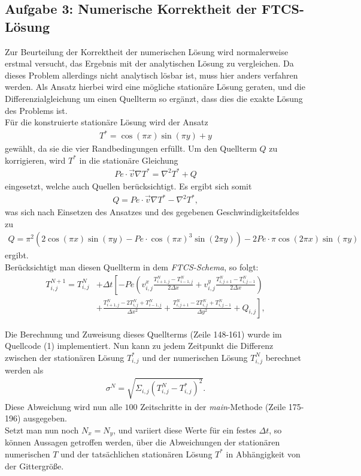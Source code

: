 \documentclass[12pt,a4paper,titlepage,headinclude,bibtotoc]{scrartcl}
\begin{document}
\subsection{Aufgabe 3: Numerische Korrektheit der FTCS-Lösung}
\label{sec:task3}
Zur Beurteilung der Korrektheit der numerischen Lösung wird normalerweise erstmal versucht, das Ergebnis mit der analytischen Lösung zu vergleichen. Da dieses Problem allerdings nicht analytisch lösbar ist, muss hier anders verfahren werden. Als Ansatz hierbei wird eine mögliche stationäre Lösung geraten, und die Differenzialgleichung um einen Quellterm so ergänzt, dass dies die exakte Lösung des Problems ist.\\
Für die konstruierte stationäre Lösung wird der Ansatz
\begin{align*}
T^* = \cos(\pi x) \sin(\pi y) + y
\end{align*} 
gewählt, da sie die vier Randbedingungen erfüllt.
Um den Quellterm $Q$ zu korrigieren, wird $T^*$ in die stationäre Gleichung
\begin{align*}
Pe \cdot \vec{v} \nabla T^* = \nabla^2 T^* + Q 
\end{align*}
eingesetzt, welche auch Quellen berücksichtigt. Es ergibt sich somit
\begin{align*}
Q = Pe \cdot \vec{v} \nabla T^* - \nabla^2 T^*,
\end{align*}
was sich nach Einsetzen des Ansatzes und des gegebenen Geschwindigkeitsfeldes zu
\begin{align*}
Q = \pi^2 \left(2 \cos(\pi x) \sin(\pi y) - Pe \cdot \cos(\pi x)^3 \sin(2 \pi y) \right) - 2 Pe \cdot \pi \cos(2 \pi x) \sin(\pi y)
\end{align*}
ergibt.\\
Berücksichtigt man diesen Quellterm in dem \textit{FTCS-Schema}, so folgt:
\begin{align}
\label{eq:ftcs_source}
T_{i,j}^{N+1} = T_{i,j}^N & + \Delta t \left[ -Pe \left( v^x_{i,j} \frac{T_{i+1,j}^N-T_{i-1,j}^N}{2\Delta x}+v^y_{i,j} \frac{T_{i,j+1}^N-T_{i,j-1}^N}{2\Delta x} \right) \right. \nonumber \\ 
 & \left.+ \frac{ T_{i+1,j}^N - 2 T_{i,j}^N +  T_{i-1,j}^N }{\Delta x^2} 
+ \frac{ T_{i,j+1}^N - 2  T_{i,j}^N + T_{i,j-1}^N}{\Delta y^2} + Q_{i,j} \right],
\end{align}

Die Berechnung und Zuweisung dieses Quellterms (Zeile 148-161) wurde im Quellcode (1) implementiert. 
Nun kann zu jedem Zeitpunkt die Differenz zwischen der stationären Lösung $T_{i,j}^*$ und der numerischen Lösung $T_{i,j}^N$ berechnet werden als
\begin{align*}
\sigma^N = \sqrt{\Sigma_{i,j} (T_{i,j}^N - T_{i,j}^*)^2 }.
\end{align*}
Diese Abweichung wird nun alle $100$ Zeitschritte in der \textit{main}-Methode (Zeile 175-196) ausgegeben.\\
Setzt man nun noch $N_x = N_y$, und variiert diese Werte für ein festes $\Delta t$, so können Aussagen getroffen werden, über die Abweichungen der stationären numerischen $T$ und der tatsächlichen stationären Lösung $T^*$ in Abhängigkeit von der Gittergröße.
\end{document}

